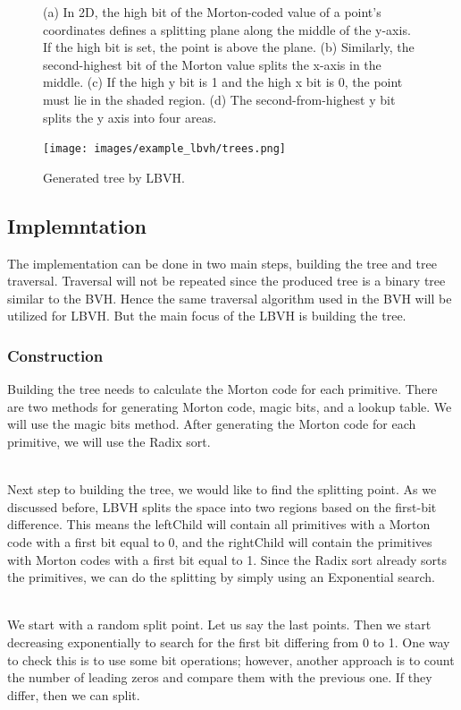 \documentclass[11pt,a4paper]{article}
\begin{document}
\begin{figure}[H]
        \caption{(a) In 2D, the high bit of the Morton-coded value of a point’s coordinates defines a splitting plane along the middle of the y-axis. If the high bit is set, the point is above the plane. (b) Similarly, the second-highest bit of the Morton value splits the x-axis in the middle. (c) If the high y bit is 1 and the high x bit is 0, the point must lie in the shaded region. (d) The second-from-highest y bit splits the y axis into four areas. }
        \label{fig:three graphs}
\end{figure}



\begin{figure}[h]	
     \centering
     \captionsetup{justification=centering,margin=2cm}
     \texttt{[image: images/example\_lbvh/trees.png]}
     \caption{Generated tree by LBVH.}
     \label{fig:dice}
\end{figure}


\subsection{Implemntation}
The implementation can be done in two main steps, building the tree and tree traversal. Traversal will not be repeated since the produced tree is a binary tree similar to the BVH. Hence the same traversal algorithm used in the BVH will be utilized for LBVH. But the main focus of the LBVH is building the tree.


\subsubsection{Construction}
 Building the tree needs to calculate the Morton code for each primitive. There are two methods for generating Morton code, magic bits, and a lookup table. We will use the magic bits method. After generating the Morton code for each primitive, we will use the Radix sort.

\noindent
\\
Next step to building the tree, we would like to find the splitting point. As we discussed before, LBVH splits the space into two regions based on the first-bit difference. This means the leftChild will contain all primitives with a Morton code with a first bit equal to 0, and the rightChild will contain the primitives with Morton codes with a first bit equal to 1. Since the Radix sort already sorts the primitives, we can do the splitting by simply using an Exponential search. 

\noindent
\\
We start with a random split point. Let us say the last points. Then we start decreasing exponentially to search for the first bit differing from 0 to 1. One way to check this is to use some bit operations; however, another approach is to count the number of leading zeros and compare them with the previous one. If they differ, then we can split. 
\end{document}
